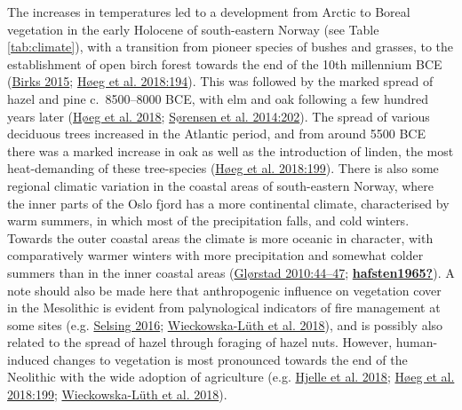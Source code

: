 \documentclass[
  a4paper,
  oneside]{uiophdthesis}
\begin{document}
The increases in temperatures led to a development from Arctic to Boreal vegetation in the early Holocene of south-eastern Norway (see Table \ref{tab:climate}), with a transition from pioneer species of bushes and grasses, to the establishment of open birch forest towards the end of the 10th millennium BCE (\protect\hyperlink{ref-birks2015}{Birks 2015}; \protect\hyperlink{ref-huxf8eg2018}{Høeg et al. 2018:194}). This was followed by the marked spread of hazel and pine c.~8500--8000 BCE, with elm and oak following a few hundred years later (\protect\hyperlink{ref-huxf8eg2018}{Høeg et al. 2018}; \protect\hyperlink{ref-suxf8rensen2014}{Sørensen et al. 2014:202}). The spread of various deciduous trees increased in the Atlantic period, and from around 5500 BCE there was a marked increase in oak as well as the introduction of linden, the most heat-demanding of these tree-species (\protect\hyperlink{ref-huxf8eg2018}{Høeg et al. 2018:199}). There is also some regional climatic variation in the coastal areas of south-eastern Norway, where the inner parts of the Oslo fjord has a more continental climate, characterised by warm summers, in which most of the precipitation falls, and cold winters. Towards the outer coastal areas the climate is more oceanic in character, with comparatively warmer winters with more precipitation and somewhat colder summers than in the inner coastal areas (\protect\hyperlink{ref-glorstad2010}{Glørstad 2010:44--47}; \protect\hyperlink{ref-hafsten1965}{\textbf{hafsten1965?}}). A note should also be made here that anthropogenic influence on vegetation cover in the Mesolithic is evident from palynological indicators of fire management at some sites (e.g. \protect\hyperlink{ref-selsing2016}{Selsing 2016}; \protect\hyperlink{ref-wieckowska-luth2018}{Wieckowska-Lüth et al. 2018}), and is possibly also related to the spread of hazel through foraging of hazel nuts. However, human-induced changes to vegetation is most pronounced towards the end of the Neolithic with the wide adoption of agriculture (e.g. \protect\hyperlink{ref-hjelle2018}{Hjelle et al. 2018}; \protect\hyperlink{ref-huxf8eg2018}{Høeg et al. 2018:199}; \protect\hyperlink{ref-wieckowska-luth2018}{Wieckowska-Lüth et al. 2018}).
\end{document}
